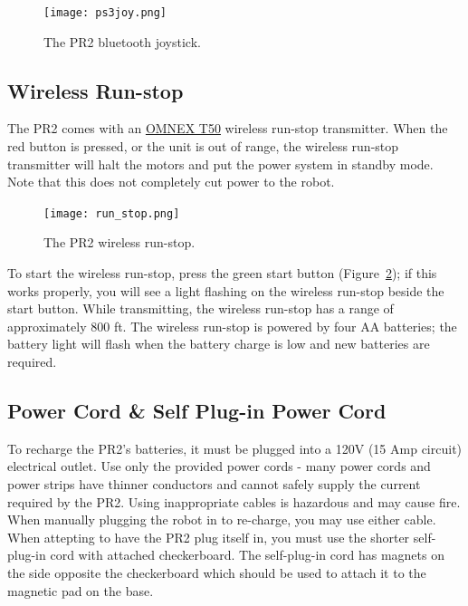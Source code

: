 \begin{figure}[h!]
\centering
\texttt{[image: ps3joy.png]}
\caption{The PR2 bluetooth joystick.}
\label{fig:ps3joy}
\end{figure}

\subsection{Wireless Run-stop}
\label{wirelessrunstop}
The PR2 comes with an
\href{http://www.omnexcontrols.com/products/portable/t50.html}{OMNEX T50}
wireless run-stop transmitter. When the red button is pressed, or the unit is
out of range, the wireless run-stop transmitter will halt the motors and put the
power system in standby mode. Note that this does not completely cut power to the robot.

\begin{figure}[h!]
\centering
\texttt{[image: run\_stop.png]}
\caption{The PR2 wireless run-stop.}
\label{fig:wirelessrunstop}
\end{figure}

To start the wireless run-stop, press the green start button (Figure~\ref{fig:wirelessrunstop});
if this works properly, you will see a light flashing on the wireless run-stop beside the start button. While
transmitting, the wireless run-stop has a range of approximately 800 ft. The wireless run-stop is
powered by four AA batteries; the battery light will flash when the battery
charge is low and new batteries are required.

\subsection{Power Cord \& Self Plug-in Power Cord}
To recharge the PR2's batteries, it must be plugged into a 120V (15 Amp circuit) electrical outlet.  Use only the provided power
cords - many power cords and power strips have thinner conductors and cannot
safely supply the current required by the PR2.  Using inappropriate cables is
hazardous and may cause fire.  When manually plugging the robot in to re-charge, you
may use either cable.  When attepting to have the PR2 plug itself in, you must
use the shorter self-plug-in cord with attached checkerboard.  The self-plug-in
cord has magnets on the side opposite the checkerboard which should be used to
attach it to the magnetic pad on the base.

